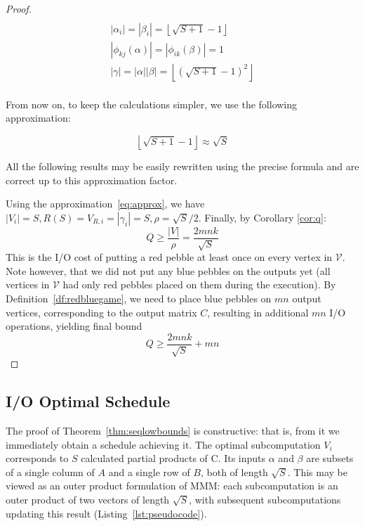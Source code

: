 \begin{proof}
	\begin{multline}
	\label{eq:seqSolution}
	\\
	|\alpha_i| = |\beta_i|= \left \lfloor{\sqrt{S + 1} - 1} \right \rfloor \\
	|\phi_{kj}(\alpha)| = |\phi_{ik}(\beta)| = 1 \\
	|\gamma| = |\alpha| |\beta| = \left \lfloor{(\sqrt{S + 1} - 1)^2} \right 
	\rfloor 
	\\
	\end{multline}
	
	
	
	From now on, to keep the calculations simpler, we use the following 
	approximation:
	
	\begin{equation}
	\label{eq:approx}
	\left \lfloor{\sqrt{S + 1} - 1} \right \rfloor \approx \sqrt{S}
	\end{equation}
	
	All the following results may be easily rewritten using the precise formula 
	and
	are correct up to this approximation factor.
	
	Using the approximation~\ref{eq:approx}, we have $|V_i| = S, R(S) = V_{R,i} 
	= 
	|\gamma_i| = S, \rho =
	\sqrt{S}/2$.
	Finally,  by Corollary \ref{cor:q}:  
	$$Q \ge
	\frac{|V|}{\rho} = \frac{2mnk}{\sqrt{S}}$$ 
	This is the I/O cost of putting a red pebble at least once on every vertex 
	in 
	$\mathcal{V}$. Note however, that we did not put any
	blue pebbles on the outputs yet (all vertices in $\mathcal{V}$ had only red
	pebbles placed on them during the execution). By
	Definition~\ref{df:redbluegame}, we need to place blue pebbles on $mn$ 
	output
	vertices, corresponding to the output matrix $C$, resulting in additional 
	$mn$
	I/O operations, yielding final bound
	$$Q \ge \frac{2mnk}{\sqrt{S}} + mn$$ 
\end{proof}

\subsection{I/O Optimal Schedule}
\label{sec:seqScheduling2}

The proof of Theorem~\ref{thm:seqlowbounds} is constructive:
that is, from it we immediately obtain a schedule achieving it. The optimal
subcomputation $V_i$ corresponds to $S$ calculated partial products of C. Its
inputs $\alpha$ and $\beta$ are subsets of a single column of $A$ and a single
row of $B$, both of length $\sqrt{S}$. This may be viewed as an outer product
formulation of MMM: each subcomputation is an outer product of two vectors of
length $\sqrt{S}$, with subsequent subcomputations updating this result
(Listing~\ref{lst:pseudocode}).

